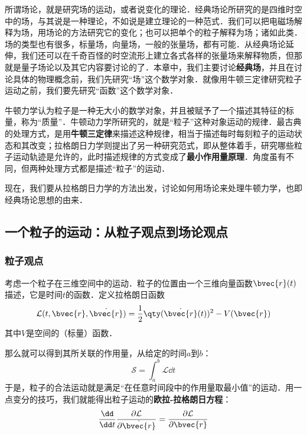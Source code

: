 





所谓场论，就是研究场的运动，或者说变化的理论．经典场论所研究的是四维时空中的场，与其说是一种理论，不如说是建立理论的一种范式．我们可以把电磁场解释为场，用场论的方法研究它的变化；也可以把单个的粒子解释为场；诸如此类．场的类型也有很多，标量场，向量场，一般的张量场，都有可能．从经典场论延伸，我们还可以在千奇百怪的时空流形上建立各式各样的张量场来解释物质，但那就是量子场论以及其它内容要讨论的了．本章中，我们主要讨论\textbf{经典场}，并且在讨论具体的物理概念前，我们先研究“场”这个数学对象．就像用牛顿三定律研究粒子运动之前，我们要先研究“函数”这个数学对象．

牛顿力学认为粒子是一种无大小的数学对象，并且被赋予了一个描述其特征的标量，称为“质量”．牛顿动力学所研究的，就是“粒子”这种对象运动的规律．最古典的处理方式，是用\textbf{牛顿三定律}来描述这种规律，相当于描述每时每刻粒子的运动状态和其改变；拉格朗日力学则提出了另一种研究范式，即从整体着手，研究哪些粒子运动轨迹是允许的，此时描述规律的方式变成了\textbf{最小作用量原理}．角度虽有不同，但两种处理方式都是描述“粒子”的运动．

现在，我们要从拉格朗日力学的方法出发，讨论如何用场论来处理牛顿力学，也即经典场论思想的由来．


\subsection{一个粒子的运动：从粒子观点到场论观点}

\subsubsection{粒子观点}

考虑一个粒子在三维空间中的运动．粒子的位置由一个三维向量函数$\bvec{r}(t)$描述，它是时间$t$的函数．定义拉格朗日函数
\begin{equation}
\mathcal{L}(t, \bvec{r},\dot{\bvec{r}}) =\frac{1}{2}\qty(\dot{\bvec{r}}(t))^2-V(\bvec{r})
\end{equation}
其中$V$是空间的（标量）函数．

那么就可以得到其所关联的作用量，从给定的时间$a$到$b$：
\begin{equation}
\mathcal{S}=\int ^b_a \mathcal{L} \dd t
\end{equation}
于是，粒子的合法运动就是满足“在任意时间段中的作用量取最小值”的运动．用一点变分的技巧，我们就能得出粒子运动的\textbf{欧拉-拉格朗日方程}：
\begin{equation}\label{CFa1_eq1}
\frac{\dd}{\dd t}\frac{\partial\mathcal{L}}{\partial \dot{\bvec{r}}} = \frac{\partial\mathcal{L}}{\partial \bvec{r}}
\end{equation}

